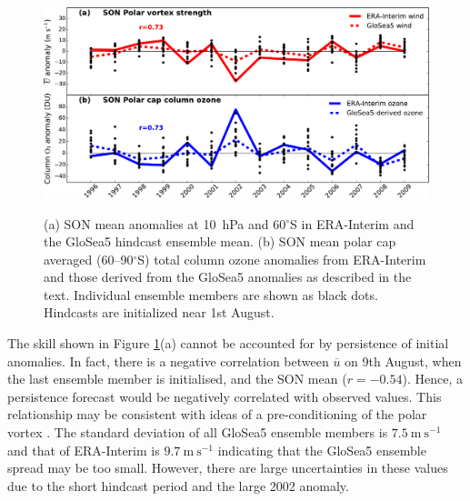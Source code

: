\begin{figure}[t]
  \noindent\includegraphics[width=\textwidth,angle=0]{figures/chapter-seasonal/zmzw_ozone_crop.pdf}\\
  \caption[GloSea5 forecast skill for $\overline{u}$ and O$_3$]{(a) SON mean
    anomalies at 10~hPa and 60$^{\circ}$S in ERA-Interim and the GloSea5
    hindcast ensemble mean. (b) SON mean polar cap averaged (60--90$^{\circ}$S)
    total column ozone anomalies from ERA-Interim and those derived from the
    GloSea5 anomalies as described in the text. Individual ensemble members are
    shown as black dots. Hindcasts are initialized near 1st
    August.}\label{fig:zmzw_ozone}
\end{figure}

The skill shown in Figure \ref{fig:zmzw_ozone}(a) cannot be accounted for by
persistence of initial anomalies. In fact, there is a negative correlation
between $\overline{u}$ on 9th August, when the last ensemble member is
initialised, and the SON mean ($r=-0.54$). Hence, a persistence forecast would
be negatively correlated with observed values. This relationship may be
consistent with ideas of a pre-conditioning of the polar vortex \citep[e.g.,][
Section \ref{sec:strat-sudd-warm}]{McIntyre1983}. The standard deviation of all
GloSea5 ensemble members is $7.5~\mathrm{m~s^{-1}}$ and that of ERA-Interim is
$9.7~\mathrm{m~s^{-1}}$ indicating that the GloSea5 ensemble spread may be too
small. However, there are large uncertainties in these values due to the short
hindcast period and the large 2002 anomaly.

